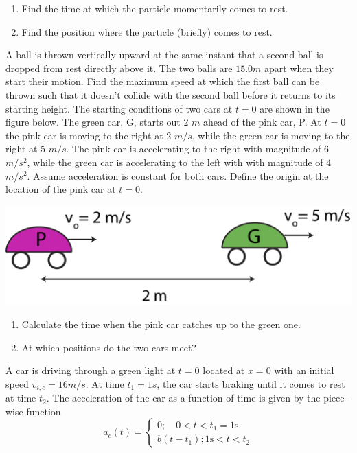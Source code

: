 \documentclass[12pt,addpoints]{exam}
\begin{document}
\begin{questions}
\begin{enumerate}[label*=(\Alph*)]
			\item Find the time at which the particle momentarily comes to rest.
			\item Find the position where the particle (briefly) comes to rest.
		\end{enumerate}
		\question[15] A ball is thrown vertically upward at the same instant that a second ball is dropped from rest directly above it. The two balls are  $15.0m$ apart when they start their motion. Find the maximum speed at which the first ball can be thrown such that it doesn't collide with the second ball before it returns to its starting height. 
		\question[15] The starting conditions of two cars at $t=0$ are shown in the figure below. The green car, G, starts out 2 $m$ ahead of the pink car, P. At $t=0$ the pink car is moving to the right at 2 $m/s$, while the green car is moving to the right at 5 $m/s$. The pink car is accelerating to the right with magnitude of 6 $m/s^2$, while the green car is accelerating to the left with with magnitude of 4 $m/s^2$. Assume acceleration is constant for both cars. Define the origin at the location of the pink car at  $t=0$.
		\begin{center}
			\includegraphics[scale=0.5]{q4.png}
		\end{center}
		\begin{enumerate}[label*=(\Alph*)]
			\item Calculate the time when the pink car catches up to the green one.
			\item At which positions do the two cars meet?
		\end{enumerate}
		\question[20] A car is driving through a green light at $t = 0$ located at $x=0$ with an initial speed $v_{i,c}=16m/s$. At time  $t_1=1s$, the car starts braking until it comes to rest at time $t_2$. The acceleration of the car as a function of time is given by the piece-wise function
		$$a_{c}(t)=\left\{\begin{array}{l} 
			0 ; \quad 0<t<t_{1}=1 \mathrm{s} \\ 
			b\left(t-t_{1}\right) ; 1 \mathrm{s}<t<t_{2} 
		\end{array}\right. \nonumber$$

\end{questions}
\end{document}
